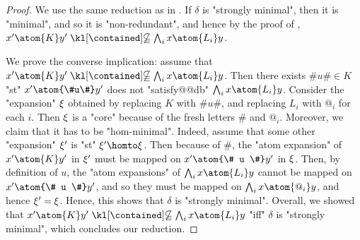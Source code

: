 \begin{proof}
	We use the same reduction as in .
	If $\delta$ is "strongly minimal", then it is "minimal", and so it is
	"non-redundant", and hence
	by the proof of ,
	$x' \atom{K} y' \notcontained \bigwedge_i x \atom{L_i} y$.
	
	We prove the converse implication: assume that
		$x' \atom{K} y' \notcontained \bigwedge_i x \atom{L_i} y$.
	Then there exists $\#u\# \in K$ "st" $x' \atom{\#u\#} y'$
	does not "satisfy@@db" $\bigwedge_i x \atom{L_i} y$.
	Consider the "expansion" $\xi$ obtained by replacing $K$ with $\#u\#$, and replacing 
	$L_i$ with $@_i$ for each $i$.
	Then $\xi$ is a "core" because of the fresh letters $\#$ and $@_i$.
	Moreover, we claim that it has to be "hom-minimal".
	Indeed, assume that some other "expansion" $\xi'$ is "st" $\anexpansion'\homto \anexpansion$.
	Then because of $\#$, the "atom expansion" of $x' \atom{K} y'$ in $\xi'$ 
	must be mapped on $x' \atom{\# u \#} y'$ in $\xi$.
	Then, by definition of $u$, the "atom expansions" of $\bigwedge_i x \atom{L_i} y$
	cannot be mapped on $x' \atom{\# u \#} y'$, and so they must be mapped on
	$\bigwedge_i x \atom{@_i} y$, and hence $\xi' = \xi$.
	Hence, this shows that $\delta$ is "strongly minimal".
	Overall, we showed that $x' \atom{K} y' \notcontained \bigwedge_i x \atom{L_i} y$
	"iff" $\delta$ is "strongly minimal", which concludes our reduction.
\end{proof}